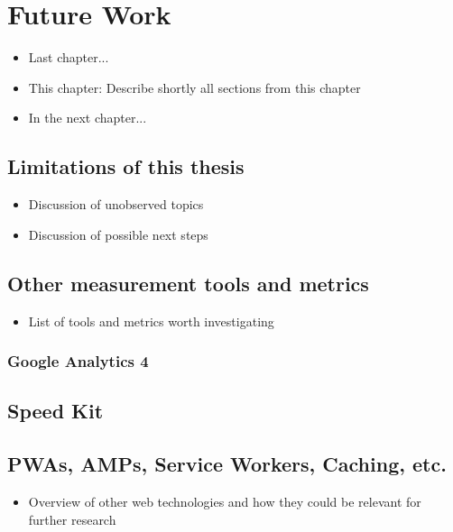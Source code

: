 \chapter{Future Work}

\begin{itemize}
	\item Last chapter...
	\item This chapter: Describe shortly all sections from this chapter
	\item In the next chapter...
\end{itemize}

\section{Limitations of this thesis}

\begin{itemize}
\item Discussion of unobserved topics
\item Discussion of possible next steps
\end{itemize}

\section{Other measurement tools and metrics}

\begin{itemize}
\item List of tools and metrics worth investigating
\end{itemize}

\subsection{Google Analytics 4}


\section{Speed Kit}



\section{PWAs, AMPs, Service Workers, Caching, etc.}

\begin{itemize}
\item Overview of other web technologies and how they could be relevant for further research
\end{itemize}